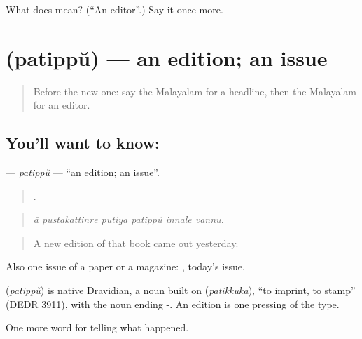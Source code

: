 \begin{tcolorbox}[breakable,colback=teal!4,colframe=teal!35!black,title={Before you move on}]
What does  mean? (\textquotedblleft{}An editor\textquotedblright{}.) Say it once more.
\end{tcolorbox}
\section[\texorpdfstring{\ml{പതിപ്പ്} (patippŭ)}{പതിപ്പ് (patippŭ)}]{ (patippŭ) — an edition; an issue}

\label{lesson:ML-C350-patippu}



\begin{quote}
Before the new one: say the Malayalam for a headline, then the Malayalam for an editor.
\end{quote}

\subsection*{You'll want to know: }
\textbf{} — \emph{patippŭ} — \textquotedblleft{}an edition; an issue\textquotedblright{}.

\begin{quote}
     .
\end{quote}

\begin{quote}
\emph{ā pustakattinṟe putiya patippŭ innale vannu.}
\end{quote}

\begin{quote}
A new edition of that book came out yesterday.
\end{quote}

Also one issue of a paper or a magazine:  , today's issue.

\begin{cousinweb}
\textbf{} (\emph{patippŭ}) is native Dravidian, a noun built on  (\emph{patikkuka}), \textquotedblleft{}to imprint, to stamp\textquotedblright{} (DEDR 3911), with the noun ending -. An edition is one pressing of the type.
\end{cousinweb}

\begin{grammarlens}[title={What you've built}]
One more word for telling what happened.
\end{grammarlens}

